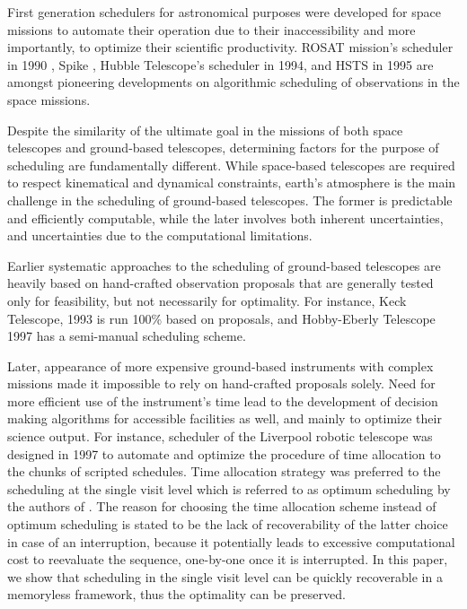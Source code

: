 \documentclass[12pt]{aastex62}
\theoremstyle{definition}
\begin{document}
First generation schedulers for astronomical purposes were developed for space missions to automate their operation due to their inaccessibility and more importantly, to optimize their scientific productivity. ROSAT mission's scheduler in 1990 \citep{nowakovski1999using},  Spike \citep{johnston1994spike}, Hubble Telescope's scheduler in 1994, and HSTS \citep{muscettola1995automating} in 1995 are amongst pioneering developments on algorithmic scheduling of observations in the space missions. 

Despite the similarity of the ultimate goal in the missions of both space telescopes and ground-based telescopes, determining factors for the purpose of scheduling are fundamentally different. While space-based telescopes are required to respect kinematical and dynamical constraints, earth's atmosphere is the main challenge in the scheduling of ground-based telescopes. The former is predictable and efficiently computable, while the later involves both inherent uncertainties, and uncertainties due to the computational limitations. 

Earlier systematic approaches to the scheduling of ground-based telescopes are heavily based on hand-crafted observation proposals that are generally tested only for feasibility, but not necessarily for optimality. For instance,  Keck Telescope, 1993 \citep{nelson1985design} is run 100\% based on proposals, and Hobby-Eberly Telescope 1997 \citep{shetrone2007ten} has a semi-manual scheduling scheme. 

Later, appearance of more expensive ground-based instruments with complex missions made it impossible to rely on hand-crafted proposals solely. Need for more efficient use of the instrument's time lead to the development of decision making algorithms for accessible facilities as well, and mainly to optimize their science output. For instance, scheduler of the Liverpool robotic telescope was designed in 1997 to automate and optimize the procedure of time allocation to the chunks of scripted schedules. Time allocation strategy was preferred to the scheduling at the single visit level which is referred to as optimum scheduling by the authors of \citep{steele1997control}. The reason for choosing the time allocation scheme instead of optimum scheduling is stated to be the lack of recoverability of the latter choice in case of an interruption, because it potentially leads to excessive computational cost to reevaluate the sequence, one-by-one once it is interrupted. In this paper, we show that scheduling in the single visit level can be quickly recoverable in a memoryless framework, thus the optimality can be preserved.
\end{document}
